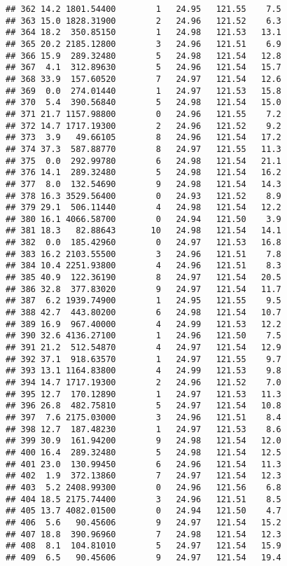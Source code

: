 \documentclass[
]{article}
\begin{document}
\begin{verbatim}
## 362 14.2 1801.54400        1   24.95   121.55    7.5
## 363 15.0 1828.31900        2   24.96   121.52    6.3
## 364 18.2  350.85150        1   24.98   121.53   13.1
## 365 20.2 2185.12800        3   24.96   121.51    6.9
## 366 15.9  289.32480        5   24.98   121.54   12.8
## 367  4.1  312.89630        5   24.96   121.54   15.7
## 368 33.9  157.60520        7   24.97   121.54   12.6
## 369  0.0  274.01440        1   24.97   121.53   15.8
## 370  5.4  390.56840        5   24.98   121.54   15.0
## 371 21.7 1157.98800        0   24.96   121.55    7.2
## 372 14.7 1717.19300        2   24.96   121.52    9.2
## 373  3.9   49.66105        8   24.96   121.54   17.2
## 374 37.3  587.88770        8   24.97   121.55   11.3
## 375  0.0  292.99780        6   24.98   121.54   21.1
## 376 14.1  289.32480        5   24.98   121.54   16.2
## 377  8.0  132.54690        9   24.98   121.54   14.3
## 378 16.3 3529.56400        0   24.93   121.52    8.9
## 379 29.1  506.11440        4   24.98   121.54   12.2
## 380 16.1 4066.58700        0   24.94   121.50    3.9
## 381 18.3   82.88643       10   24.98   121.54   14.1
## 382  0.0  185.42960        0   24.97   121.53   16.8
## 383 16.2 2103.55500        3   24.96   121.51    7.8
## 384 10.4 2251.93800        4   24.96   121.51    8.3
## 385 40.9  122.36190        8   24.97   121.54   20.5
## 386 32.8  377.83020        9   24.97   121.54   11.7
## 387  6.2 1939.74900        1   24.95   121.55    9.5
## 388 42.7  443.80200        6   24.98   121.54   10.7
## 389 16.9  967.40000        4   24.99   121.53   12.2
## 390 32.6 4136.27100        1   24.96   121.50    7.5
## 391 21.2  512.54870        4   24.97   121.54   12.9
## 392 37.1  918.63570        1   24.97   121.55    9.7
## 393 13.1 1164.83800        4   24.99   121.53    9.8
## 394 14.7 1717.19300        2   24.96   121.52    7.0
## 395 12.7  170.12890        1   24.97   121.53   11.3
## 396 26.8  482.75810        5   24.97   121.54   10.8
## 397  7.6 2175.03000        3   24.96   121.51    8.4
## 398 12.7  187.48230        1   24.97   121.53    8.6
## 399 30.9  161.94200        9   24.98   121.54   12.0
## 400 16.4  289.32480        5   24.98   121.54   12.5
## 401 23.0  130.99450        6   24.96   121.54   11.3
## 402  1.9  372.13860        7   24.97   121.54   12.3
## 403  5.2 2408.99300        0   24.96   121.56    6.8
## 404 18.5 2175.74400        3   24.96   121.51    8.5
## 405 13.7 4082.01500        0   24.94   121.50    4.7
## 406  5.6   90.45606        9   24.97   121.54   15.2
## 407 18.8  390.96960        7   24.98   121.54   12.3
## 408  8.1  104.81010        5   24.97   121.54   15.9
## 409  6.5   90.45606        9   24.97   121.54   19.4
\end{verbatim}
\end{document}
